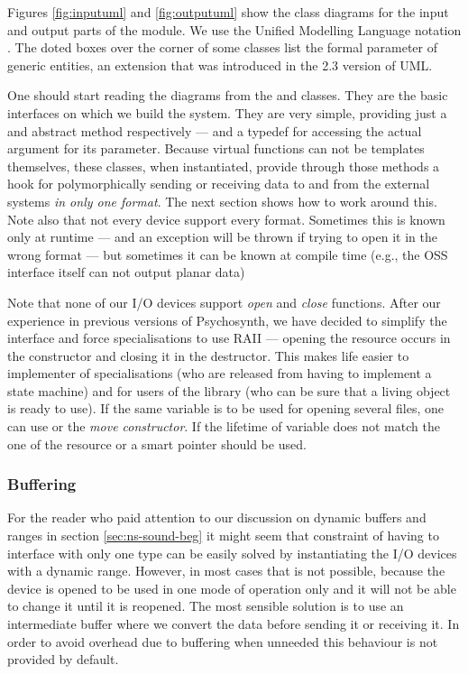 Figures \ref{fig:inputuml} and \ref{fig:outputuml} show the class
diagrams for the input and output parts of the module. We use the
Unified Modelling Language notation \cite{umlspec}. The doted boxes over
the corner of some classes list the formal parameter of generic
entities, an extension that was introduced in the 2.3 version of
UML. 

One should start reading the diagrams from the  and
 classes. They are the basic interfaces on which we build
the system. They are very simple, providing just a  and  abstract method
respectively --- and a typedef for accessing the actual argument for
its  parameter. Because virtual functions can not be
templates themselves, these classes, when instantiated, provide
through those methods a hook for polymorphically sending or receiving
data to and from the external systems \emph{in only one
  format}. The next section shows how to work around this. Note also
that not every device support every format. Sometimes this is known
only at runtime --- and an exception will be thrown if trying to open
it in the wrong format --- but sometimes it can be known at compile
time (e.g., the OSS interface itself can not output planar data) 

Note that none of our I/O devices support \emph{open} and \emph{close}
functions. After our experience in previous versions of Psychosynth,
we have decided to simplify the interface and force specialisations to
use RAII --- opening the resource occurs in the constructor and closing it
in the destructor. This makes life easier to implementer of
specialisations (who are released from having to implement a state
machine) and for users of the library (who can be sure that a living
object is ready to use). If the same variable is to be used for
opening several files, one can use  or the \emph{move
  constructor}. If the lifetime of variable does not match the one of
the resource  or a smart pointer should be used.

\subsubsection{Buffering}

For the reader who paid attention to our discussion on dynamic buffers
and ranges in section \ref{sec:ns-sound-beg} it might seem that
constraint of having to interface with only one type can be easily
solved by instantiating the I/O devices with a dynamic range. However,
in most cases that is not possible, because the device is opened to be
used in one mode of operation only and it will not be able to change
it until it is reopened. The most sensible solution is to use an
intermediate buffer where we convert the data before sending it or
receiving it. In order to avoid overhead due to buffering when
unneeded this behaviour is not provided by default.

